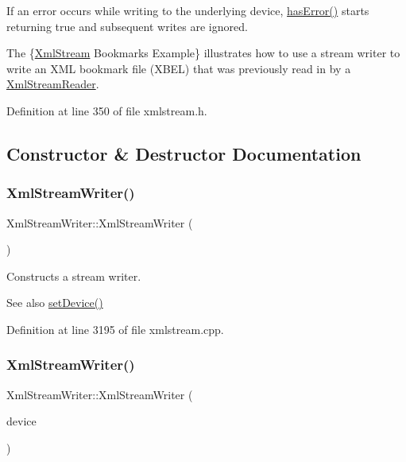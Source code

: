 If an error occurs while writing to the underlying device, \hyperlink{class_xml_stream_writer_a8a336415622c257d2df545b088e38eef}{has\+Error()} starts returning true and subsequent writes are ignored.

The \{\hyperlink{class_xml_stream}{Xml\+Stream} Bookmarks Example\} illustrates how to use a stream writer to write an X\+ML bookmark file (X\+B\+EL) that was previously read in by a \hyperlink{class_xml_stream_reader}{Xml\+Stream\+Reader}. 

Definition at line 350 of file xmlstream.\+h.



\subsection{Constructor \& Destructor Documentation}
\mbox{\label{class_xml_stream_writer_acaffb798a42742e6be689bc0cf9b80d9}} 
\subsubsection{\texorpdfstring{Xml\+Stream\+Writer()}{XmlStreamWriter()}\hspace{0.1cm}{\footnotesize\ttfamily [1/4]}}
{\footnotesize\ttfamily Xml\+Stream\+Writer\+::\+Xml\+Stream\+Writer (\begin{DoxyParamCaption}{ }\end{DoxyParamCaption})}

Constructs a stream writer.

\begin{DoxySeeAlso}{See also}
\hyperlink{class_xml_stream_writer_ac03d4a48cc662d5c43a136560f514fd3}{set\+Device()} 
\end{DoxySeeAlso}


Definition at line 3195 of file xmlstream.\+cpp.

\mbox{\label{class_xml_stream_writer_adad3a38281bd2eee59f7240098fb0c96}} 
\subsubsection{\texorpdfstring{Xml\+Stream\+Writer()}{XmlStreamWriter()}\hspace{0.1cm}{\footnotesize\ttfamily [2/4]}}
{\footnotesize\ttfamily Xml\+Stream\+Writer\+::\+Xml\+Stream\+Writer (\begin{DoxyParamCaption}\item[{Q\+I\+O\+Device $\ast$}]{device }\end{DoxyParamCaption})\hspace{0.3cm}{\ttfamily [explicit]}}

